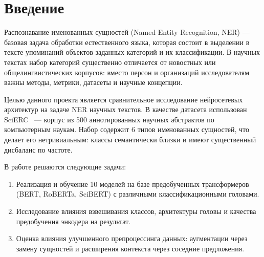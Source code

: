 \section*{Введение}

Распознавание именованных сущностей (Named Entity Recognition, NER) --- базовая задача обработки естественного языка, которая состоит в выделении в тексте упоминаний объектов заданных категорий и их классификации. В научных текстах набор категорий существенно отличается от новостных или общелингвистических корпусов: вместо персон и организаций исследователям важны методы, метрики, датасеты и научные концепции.

Целью данного проекта является сравнительное исследование нейросетевых архитектур на задаче NER научных текстов. В качестве датасета использован SciERC~\cite{luan2018scierc} --- корпус из 500 аннотированных научных абстрактов по компьютерным наукам. Набор содержит 6 типов именованных сущностей, что делает его нетривиальным: классы семантически близки и имеют существенный дисбаланс по частоте.

В работе решаются следующие задачи:
\begin{enumerate}
    \item Реализация и обучение 10 моделей на базе предобученных трансформеров (BERT, RoBERTa, SciBERT) с различными классификационными головами.
    \item Исследование влияния взвешивания классов, архитектуры головы и качества предобучения энкодера на результат.
    \item Оценка влияния улучшенного препроцессинга данных: аугментации через замену сущностей и расширения контекста через соседние предложения.
\end{enumerate}
